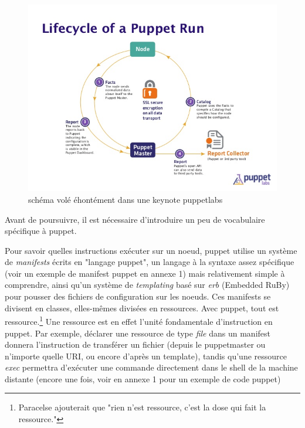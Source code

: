 \documentclass[14 pt]{extreport}
\begin{document}
\begin{figure}[H]
\centering
\includegraphics[scale=0.70]{puppetrun.jpg}
\caption{schéma volé éhontément dans une keynote puppetlabs}
\label{}
\end{figure}

Avant de poursuivre, il est nécessaire d'introduire un peu de vocabulaire spécifique à puppet.

Pour savoir quelles instructions exécuter sur un noeud, puppet utilise un système de \emph{manifests} écrits en "langage puppet", un langage à la syntaxe assez spécifique (voir un exemple de manifest puppet en annexe 1) mais relativement simple à comprendre, ainsi qu'un système de \emph{templating} basé sur \emph{erb} (Embedded RuBy) pour pousser des fichiers de configuration sur les noeuds. Ces manifests se divisent en classes, elles-mêmes divisées en ressources. Avec puppet, tout est ressource.\footnote{Paracelse ajouterait que "rien n'est ressource, c'est la dose qui fait la ressource."} Une ressource est en effet l'unité fondamentale d'instruction en puppet. Par exemple, déclarer une ressource de type \emph{file} dans un manifest donnera l'instruction de transférer un fichier (depuis le puppetmaster ou n'importe quelle URI, ou encore d'après un template), tandis qu'une ressource \emph{exec} permettra d'exécuter une commande directement dans le shell de la machine distante (encore une fois, voir en annexe 1 pour un exemple de code puppet)
\end{document}
